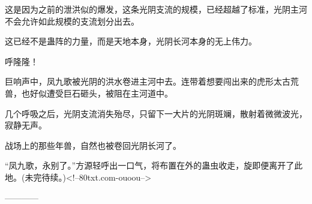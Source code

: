 \begin{this_body}
这是因为之前的泄洪似的爆发，这条光阴支流的规模，已经超越了标准，光阴主河不会允许如此规模的支流划分出去。

这已经不是蛊阵的力量，而是天地本身，光阴长河本身的无上伟力。

呼隆隆！

巨响声中，凤九歌被光阴的洪水卷进主河中去。连带着想要闯出来的虎形太古荒兽，也好似遭受巨石砸头，被阻在主河道中。

几个呼吸之后，光阴支流消失殆尽，只留下一大片的光阴斑斓，散射着微微波光，寂静无声。

战场上的那些年兽，自然也被卷回光阴长河了。

“凤九歌，永别了。”方源轻呼出一口气，将布置在外的蛊虫收走，旋即便离开了此地。(未完待续。)<!--80txt.com-ouoou-->

------------

\end{this_body}

